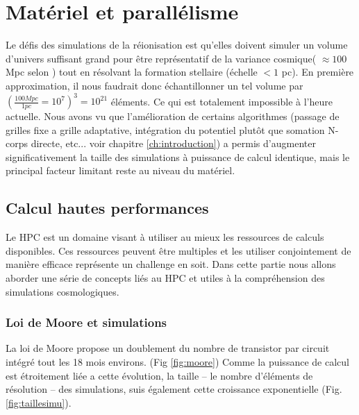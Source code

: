 
\chapter{Matériel et parallélisme}
\label{sec:materiel}

Le défis des simulations de la réionisation est qu'elles doivent simuler un volume d'univers suffisant grand pour être représentatif de la variance cosmique( $\approx 100$ Mpc selon \cite{iliev_cosmological_2006}) tout en résolvant la formation stellaire (échelle $<1$ pc).
En première approximation, il nous faudrait donc échantillonner un tel volume par $\left( \frac{100Mpc}{1pc} = 10^7 \right) ^3 = 10^{21}$ éléments.
Ce qui est totalement impossible à l'heure actuelle.
Nous avons vu que l'amélioration de certains algorithmes (passage de grilles fixe a grille adaptative, intégration du potentiel plutôt que somation N-corps directe, etc... voir chapitre \ref{ch:introduction}) a permis d'augmenter significativement la taille des simulations à puissance de calcul identique, mais le principal facteur limitant reste au niveau du matériel.

\section{Calcul hautes performances}

Le \ac{HPC} est un domaine visant à utiliser au mieux les ressources de calculs disponibles.
Ces ressources peuvent être multiples et les utiliser conjointement de manière efficace représente un challenge en soit.
Dans cette partie nous allons aborder une série de concepts liés au \ac{HPC} et utiles à la compréhension des simulations cosmologiques.


\subsection{Loi de Moore et simulations}
La loi de Moore \citep{moore1965cramming} propose un doublement du nombre de transistor par circuit intégré tout les 18 mois environs. (Fig \ref{fig:moore})
Comme la puissance de calcul est étroitement liée a cette évolution, la taille -- le nombre d'éléments de résolution -- des simulations, suis également cette croissance exponentielle (Fig. \ref{fig:taillesimu}).

